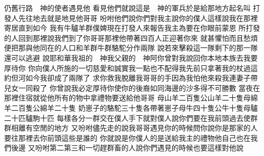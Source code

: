 \bchapter%
仍舊行路\chientien 　神的使者遇見他\chuan 
{}看見他們就說\chientien 這是　神的軍兵\yuentien 於是給那地方起名叫\chuan{}
打發人先往地去\chientien 就是地\chientien 見他哥哥\chuan 
{}吩咐他們說\chientien 你們對我主說\chientien 你的僕人這樣說\chientien 我在那裡寄居\chientien 直到如今\chuan 
{}我有牛\chientien 驢\chientien 羊群\chientien 僕婢\chientien 現在打發人來報告我主\chientien 為要在你眼前蒙恩\chuan 
{}所打發的人回到那裡說\chientien 我們到了你哥哥那裡\chientien 他帶著四百人\chientien 正迎著你來\chuan 
{}就甚懼怕\chientien 而且愁煩\chientien 便把那與他同在的人口\chientien 和羊群\chientien 牛群\chientien 駱駝\chientien 分作兩隊\yuentien 
{}說\chientien{}若來擊殺這一隊\chientien 剩下的那一隊還可以逃避\chuan 
{}說\chientien 耶和華我祖的　神\chientien 我父親的　神阿\chientien 你曾對我說\chientien 回你本地本族去\chientien 我要厚待你\chuan 
{}你向僕人所施的一切慈愛和誠實\chientien 我一點也不配得\yuentien 我先前只拿著我的杖過這約但河\chientien 如今我卻成了兩隊了\chuan 
{}求你救我脫離我哥哥的手\chientien 因為我怕他來殺我\chientien 連妻子帶兒女一同殺了\chuan 
{}你曾說\chientien 我必定厚待你\chientien 使你的後裔如同海邊的沙\chientien 多得不可勝數\chuan 
{}當夜在那裡住宿\chientien 就從他所有的物中拿禮物\chientien 要送給他哥哥\yuentien 
{}母山羊二百隻\chientien 公山羊二十隻\chientien 母綿羊二百隻\chientien 公綿羊二十隻\chientien 
{}奶崽子的駱駝三十隻\chientien 各帶著崽子\chientien 母牛四十隻\chientien 公牛十隻\chientien 母驢二十匹\chientien 驢駒十匹\yuentien 
{}每樣各分一群\chientien 交在僕人手下\chientien 就對僕人說\chientien 你們要在我前頭過去\chientien 使群群相離有空閒的地方\chuan 
{}又吩咐儘先走的說\chientien 我哥哥遇見你的時候\chientien 問你說\chientien 你是那家的人\chientien 要往那裡去\chientien 你前頭這些是誰的\yuentien 
{}你就說\chientien 是你僕人的\chientien 是送給我主的禮物\chientien 他自己也在我們後邊\chuan 
{}又吩咐第二\chientien 第三\chientien 和一切趕群畜的人說\chientien 你們遇見的時候\chientien 也要這樣對他說\yuentien 
